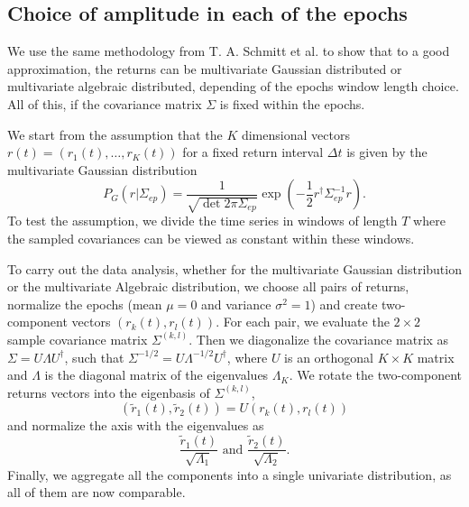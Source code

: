 \subsection{Choice of amplitude in each of the epochs}\label{subsec:epochs}

We use the same methodology from T. A. Schmitt et al.
\cite{non_stationarity_fin_guhr} to show that to a good approximation, the
returns can be multivariate Gaussian distributed or multivariate algebraic
distributed, depending of the epochs window length choice. All of this, if the
covariance matrix $\Sigma$ is fixed within the epochs.

We start from the assumption that the $K$ dimensional vectors
$r \left( t \right) = \left( r_{1} \left( t \right), \ldots, r_{K} \left( t \right) \right)$
for a fixed return interval $\Delta t$ is given by the multivariate Gaussian
distribution
\begin{equation}\label{eq:gaussian_distribution}
    P_{G} \left( r| \Sigma_{ep} \right) =
    \frac{1}{\sqrt{\det 2 \pi \Sigma_{ep} }}
    \exp \left( - \frac{1}{2} r^{\dagger} \Sigma_{ep}^{-1} r \right).
\end{equation}
To test the assumption, we divide the time series in windows of length $T$
where the sampled covariances can be viewed as constant within these windows.

To carry out the data analysis, whether for the multivariate Gaussian
distribution or the multivariate Algebraic distribution, we choose all pairs of
returns, normalize the epochs (mean $\mu = 0$ and variance $\sigma^{2} = 1$)
and create two-component vectors
$\left( r_{k} \left( t \right), r_{l} \left( t \right) \right)$. For each pair,
we evaluate the $2 \times 2$ sample covariance matrix
$\Sigma^{\left(k, l \right)}$. Then we diagonalize the covariance matrix as
$\Sigma = U \Lambda U^{\dagger}$, such that
$\Sigma^{-1/2} = U \Lambda^{-1/2} U^{\dagger}$, where $U$ is an orthogonal
$K \times K$  matrix and $\Lambda$ is the diagonal matrix of the eigenvalues
$\Lambda_{K}$. We rotate the two-component returns vectors into the eigenbasis
of $\Sigma^{\left(k, l \right)}$,
\begin{equation}
    \left(\tilde{r}_{1} \left(t \right), \tilde{r}_{2} \left(t \right) \right)
    = U \left(r_{k} \left(t \right), r_{l} \left(t \right) \right)
\end{equation}
and normalize the axis with the eigenvalues as
\begin{equation}
    \frac{\tilde{r}_{1} \left(t \right)}{\sqrt{\Lambda_{1}}} \text{ and }
    \frac{\tilde{r}_{2} \left(t \right)}{\sqrt{\Lambda_{2}}}.
\end{equation}
Finally, we aggregate all the components into a single univariate distribution,
as all of them are now comparable.


